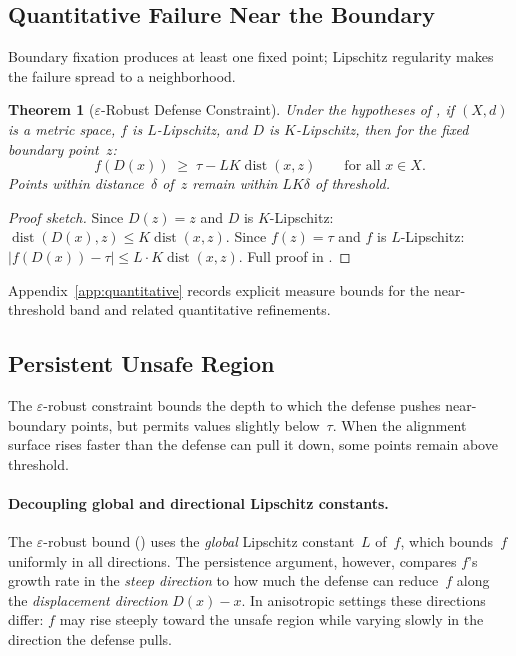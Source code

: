 \documentclass[11pt]{article}
\newtheorem{theorem}{Theorem}[section]
\newcommand{\dist}{\operatorname{dist}}
\begin{document}
\subsection{Quantitative Failure Near the Boundary}
\label{sec:eps-robust}

Boundary fixation produces at least one fixed point; Lipschitz
regularity makes the failure spread to a neighborhood.

\begin{theorem}[$\varepsilon$-Robust Defense Constraint]
\label{thm:eps-robust}
Under the hypotheses of , if $(X,d)$ is a metric
space, $f$ is $L$-Lipschitz, and $D$ is $K$-Lipschitz, then for
the fixed boundary point~$z$:
\begin{equation}
  f(D(x)) \;\geq\; \tau - LK\dist(x, z)
  \qquad \text{for all } x \in X.
\end{equation}
Points within distance~$\delta$ of~$z$ remain within
$LK\delta$ of threshold.
\end{theorem}

\begin{proof}[Proof sketch]
Since $D(z)=z$ and $D$ is $K$-Lipschitz:
$\dist(D(x),z) \leq K\dist(x,z)$. Since $f(z)=\tau$ and $f$ is
$L$-Lipschitz:
$|f(D(x)) - \tau| \leq L \cdot K\dist(x,z)$.
Full proof in .
\end{proof}

Appendix~\ref{app:quantitative} records explicit measure bounds for the
near-threshold band and related quantitative refinements.

\subsection{Persistent Unsafe Region}
\label{sec:persistent}

The $\varepsilon$-robust constraint bounds the depth to which the
defense pushes near-boundary points, but permits values slightly
below~$\tau$. When the alignment surface rises faster than the
defense can pull it down, some points remain above threshold.

\paragraph{Decoupling global and directional Lipschitz constants.}
The $\varepsilon$-robust bound () uses the
\emph{global} Lipschitz constant~$L$ of~$f$, which bounds~$f$
uniformly in all directions. The persistence argument, however,
compares $f$'s growth rate in the \emph{steep direction} to how much
the defense can reduce~$f$ along the \emph{displacement direction}
$D(x) - x$. In anisotropic settings these directions differ: $f$ may
rise steeply toward the unsafe region while varying slowly in the
direction the defense pulls.
\end{document}
